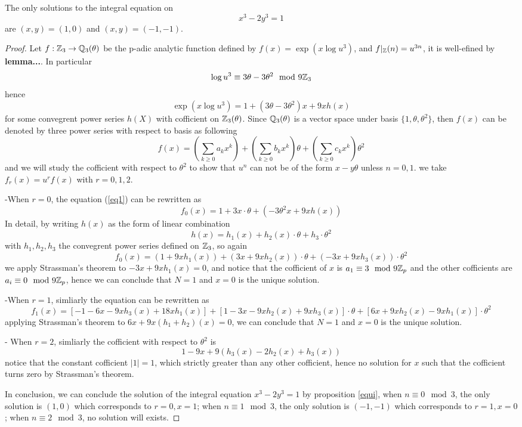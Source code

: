     \begin{theorem}
        The only solutions to the integral equation on
\[
x^{3}-2y^{3}=1
\]
are\/ $(x,y)=(1,0)$ and\/ $(x,y)=(-1,-1)$.

    \begin{proof}
         Let \(f: \mathbb{Z}_3 \to \mathbb{Q}_3(\theta)\) be the p-adic analytic function defined by \(f(x) = \exp({x\log{u^3}})\), and \(f|_{\mathbb{Z}}(n) = u^{3n}\), it is well-efined by \textbf{lemma...}. In particular
         \[\log{u^3} \equiv  3\theta-3\theta^2 \mod{9 \mathbb{Z}_3}\]
         hence 
         \begin{equation} \label{eq1}
            \exp(x \log u^3) = 1 + (3\theta-3\theta^2)x+9xh(x)
         \end{equation}
         for some convegrent power series \(h(X)\) with cofficient on \(\mathbb{Z}_3(\theta)\). Since \(\mathbb{Q}_3(\theta)\) is a vector space under basis \(\{1, \theta, \theta^2\}\), then \(f(x)\) can be denoted by three power series with respect to basis as following
         \[f(x) = (\sum_{k \geq 0}a_kx^k)+(\sum_{k \geq 0}b_kx^k)\theta + (\sum_{k \geq 0}c_kx^k)\theta^2\]
         and we will study the cofficient with respect to \(\theta^2\) to show that \(u^n\) can not be of the form \(x-y \theta\) unless \(n=0,1\). we take \(f_r(x) = u^{r}f(x)\) with \(r=0,1,2\).

         -When \(r=0\), the equation (\ref{eq1}) can be rewritten as
         \[f_0(x) = 1+ 3x\cdot \theta + (-3\theta^2x+9xh(x))\]
         In detail, by writing \(h(x)\) as the form of linear combination
         \[h(x) = h_1(x)+h_2(x)\cdot\theta + h_3 \cdot \theta^2\]
         with \(h_1,h_2,h_3\) the convegrent power series defined on \(\mathbb{Z}_3\), so again
         \[f_0(x) = (1+9xh_1(x)) + (3x+9xh_2(x))\cdot \theta + (-3x+9xh_3(x)) \cdot \theta^2\]
         we apply Strassman's theorem to \(-3x+9xh_1(x) = 0\), and notice that the cofficient of \(x\) is \(a_1 \equiv 3 \mod 9\mathbb{Z}_p\) and the other cofficients are \(a_i \equiv 0 \mod 9\mathbb{Z}_p \), hence we can conclude that \(N=1\) and \(x=0\) is the unique solution.
         
         -When \(r=1\), simliarly the equation can be rewritten as
         \[f_1(x) = [-1-6x-9xh_3(x)+18xh_1(x)]+[1-3x-9xh_2(x)+9xh_3(x)]\cdot \theta + [6x+9xh_2(x)-9xh_1(x)]\cdot \theta^2\]
         applying Strassman's theorem to \(6x+9x(h_1+h_2)(x) = 0\), we can conclude that \(N=1\) and \(x=0\) is the unique solution.

         - When \(r=2\), simliarly the cofficient with respect to \(\theta^2\) is \[1-9x+9(h_3(x)-2h_2(x)+h_3(x)) \]
         notice that the constant cofficient \(|1| = 1\), which strictly greater than any other cofficient, hence no solution for \(x\) such that the cofficient turns zero by Strassman's theorem.

         In conclusion, we can conclude the solution of the integral equation \(x^3-2y^3=1\) by proposition \ref{equi}, when \(n \equiv 0 \mod 3\),  the only solution is \((1,0)\) which corresponds to \(r=0, x=1\); when \(n \equiv 1 \mod 3\), the only solution is \((-1,-1)\) which corresponds to \(r=1,x=0\); when \(n \equiv 2 \mod 3\), no solution will exists.
    \end{proof}
    \end{theorem}


